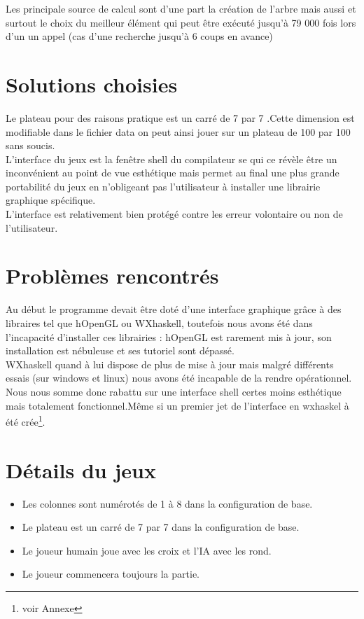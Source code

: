 \documentclass[a4paper]{article}
\begin{document}
Les principale source de calcul sont d'une part la création de l'arbre mais aussi et surtout le choix du meilleur élément qui peut être exécuté jusqu'à 79 000 fois lors d'un un appel (cas d'une recherche jusqu'à 6 coups en avance)
\newpage
\section{Solutions choisies}	%
Le plateau pour des raisons pratique est un carré de 7 par 7 .Cette dimension est modifiable dans le fichier data on peut ainsi jouer sur un plateau de 100 par 100 sans soucis.\\
L'interface du jeux est la fenêtre shell du compilateur se qui ce révèle être un inconvénient au point de vue esthétique mais permet au final une plus grande portabilité du jeux en n'obligeant pas l'utilisateur à installer une librairie graphique spécifique.\\
L'interface est relativement bien protégé contre les erreur volontaire ou non de l'utilisateur.


\section{Problèmes rencontrés}	%
Au début le programme devait être doté d'une interface graphique grâce à des libraires tel que hOpenGL ou WXhaskell, toutefois nous avons été dans l'incapacité d'installer ces librairies : hOpenGL est rarement mis à jour, son installation est nébuleuse et ses tutoriel sont dépassé.\\
WXhaskell quand à lui dispose de plus de mise à jour mais malgré différents essais (sur windows et linux) nous avons été incapable de la rendre opérationnel.\\
Nous nous somme donc rabattu sur une interface shell certes moins esthétique mais totalement fonctionnel.Même si un premier jet de l'interface en wxhaskel à été crée\footnote{voir Annexe}.


\section{Détails du jeux}
\begin{itemize}
\item Les colonnes sont numérotés de 1 à 8 dans la configuration de base.
\item Le plateau est un carré de 7 par 7 dans la configuration de base.
\item Le joueur humain joue avec les croix et l'IA avec les rond.
\item Le joueur commencera toujours la partie.
\end{itemize}
\end{document}
